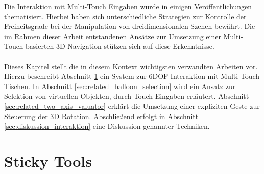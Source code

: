 Die Interaktion mit Multi-Touch Eingaben wurde in einigen Veröffentlichungen thematisiert. Hierbei haben sich unterschiedliche Strategien zur Kontrolle der Freiheitsgrade bei der Manipulation von dreidimensionalen Szenen bewährt. Die im Rahmen dieser Arbeit entstandenen Ansätze zur Umsetzung einer Multi-Touch basierten 3D Navigation stützen sich auf diese Erkenntnisse.
\\\\
Dieses Kapitel stellt die in diesem Kontext wichtigsten verwandten Arbeiten vor. Hierzu beschreibt Abschnitt \ref{sec:related_sticky_tools} ein System zur 6DOF Interaktion mit Multi-Touch Tischen. In Abschnitt \ref{sec:related_balloon_selection} wird ein Ansatz zur Selektion von virtuellen Objekten, durch Touch Eingaben erläutert. Abschnitt \ref{sec:related_two_axis_valuator} erklärt die Umsetzung einer expliziten Geste zur Steuerung der 3D Rotation. Abschließend erfolgt in Abschnitt \ref{sec:diskussion_interaktion} eine Diskussion genannter Techniken.


\section{Sticky Tools}
\label{sec:related_sticky_tools}

